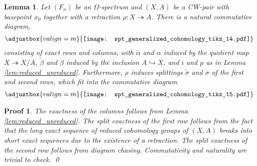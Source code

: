 \documentclass[sort&compress]{elsarticle}
\theoremstyle{theoremstyle}
\newtheorem{lem}[nul]{Lemma}
\theoremstyle{framedtheoremstyle}
\theoremstyle{definitionstyle}
\theoremstyle{definitionstyle}
\theoremstyle{definitionstyle}
\theoremstyle{definitionstyle}
\theoremstyle{nameddefinitionstyle}
\theoremstyle{framednameddefinitionstyle}
\theoremstyle{proofstyle}
\newtheorem{pf}{Proof}
\theoremstyle{definitionstyle}
\newcommand{\oneone}{\hookrightarrow}
\newcommand{\onto}{\twoheadrightarrow}
\newcommand{\paren}[1]{\left( #1 \right)}
\newcommand{\angles}[1]{\left\langle #1 \right\rangle}
\newcommand{\brackets}[1]{\left[ #1 \right]}
\newcommand{\braces}[1]{\left\{ #1 \right\}}
\begin{document}
\begin{appendices}
\begin{lem}\label{lem:retraction}
Let $(F_n)$ be an $\Omega$-spectrum and $\paren{X, A}$ be a CW-pair with basepoint $x_0$ together with a retraction $\rho: X \onto A$. There is a natural commutative diagram,
\begin{eqnarray}
\adjustbox{valign=m}{\texttt{[image: spt\_generalized\_cohomology\_tikz\_14.pdf]}}
\end{eqnarray}
consisting of exact rows and columns,
with $\tilde \alpha$ and $\alpha$ induced by the quotient map $X \onto X/A$, $\tilde \beta$ and $\beta$ induced by the inclusion $A \oneone X$, and $i$ and $p$ as in Lemma \ref{lem:reduced_unreduced}. Furthermore, $\rho$ induces splittings $\tilde \sigma$ and $\sigma$ of the first and second rows, which fit into the commutative diagram
\begin{eqnarray}
\adjustbox{valign=m}{\texttt{[image: spt\_generalized\_cohomology\_tikz\_15.pdf]}}
\end{eqnarray}
\end{lem}

\begin{pf}
The exactness of the columns follows from Lemma \ref{lem:reduced_unreduced}. The split exactness of the first row follows from the fact that the long exact sequence of reduced cohomology groups of $(X,A)$ breaks into short exact sequences due to the existence of a retraction. The split exactness of the second row follows from diagram chasing. Commutativity and naturality are trivial to check.
\qed\end{pf}


\end{appendices}
\end{document}
